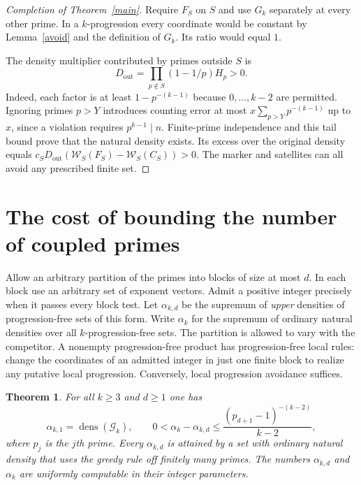 \documentclass[11pt]{article}
\newtheorem{theorem}{Theorem}
\newcommand{\dens}{\operatorname{dens}}
\newcommand{\GP}{\mathcal G_k}
\newcommand{\weight}{\mathcal W}
\begin{document}
\begin{proof}[Completion of Theorem~\ref{main}]
Require $F_S$ on $S$ and use $G_k$ separately at every other prime. In a $k$-progression every coordinate would be constant by Lemma~\ref{avoid} and the definition of $G_k$. Its ratio would equal $1$.

The density multiplier contributed by primes outside $S$ is
\[
      D_{\mathrm{out}}=\prod_{p\notin S}(1-1/p)H_p >0.
\]
Indeed, each factor is at least $1-p^{-(k-1)}$ because $0,\ldots,k-2$ are permitted. Ignoring primes $p>Y$ introduces counting error at most $x\sum_{p>Y}p^{-(k-1)}$ up to $x$, since a violation requires $p^{k-1}\mid n$. Finite-prime independence and this tail bound prove that the natural density exists. Its excess over the original density equals
$c_S D_{\mathrm{out}}(\weight_S(F_S)-\weight_S(C_S))>0$. The marker and satellites can all avoid any prescribed finite set.
\end{proof}

\section{The cost of bounding the number of coupled primes}

Allow an arbitrary partition of the primes into blocks of size at most $d$. In each block use an arbitrary set of exponent vectors. Admit a positive integer precisely when it passes every block test. Let $\alpha_{k,d}$ be the supremum of \emph{upper} densities of progression-free sets of this form. Write $\alpha_k$ for the supremum of ordinary natural densities over all $k$-progression-free sets. The partition is allowed to vary with the competitor. A nonempty progression-free product has progression-free local rules: change the coordinates of an admitted integer in just one finite block to realize any putative local progression. Conversely, local progression avoidance suffices.

\begin{theorem}\label{block}
For all $k\ge3$ and $d\ge1$ one has
\[
 \alpha_{k,1}=\dens(\GP),\qquad
 0<\alpha_k-\alpha_{k,d}\le
    \frac{(p_{d+1}-1)^{-(k-2)}}{k-2},
\]
where $p_j$ is the $j$th prime. Every $\alpha_{k,d}$ is attained by a set with ordinary natural density that uses the greedy rule off finitely many primes. The numbers $\alpha_{k,d}$ and $\alpha_k$ are uniformly computable in their integer parameters.
\end{theorem}
\end{document}
